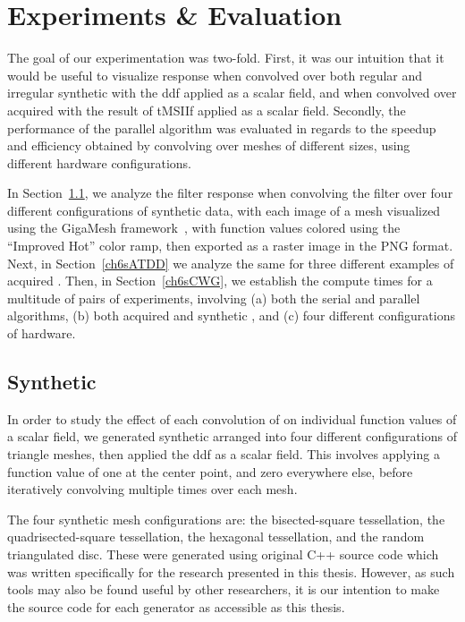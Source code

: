 \chapter{Experiments \& Evaluation}
\label{ch6}
The goal of our experimentation was two-fold. First, it was our intuition that it would be useful to visualize  response when convolved over both regular and irregular synthetic \tdd{} with the \gls{ddf} applied as a scalar field, and when convolved over acquired \tdd{} with the result of \gls{tMSIIf} applied as a scalar field. Secondly, the performance of the parallel algorithm was evaluated in regards to the speedup and efficiency obtained by convolving  over meshes of different sizes, using different hardware configurations.

In Section~\ref{ch6sSTDD}, we analyze the filter response when convolving the filter over four different configurations of synthetic data, with each image of a mesh visualized using the GigaMesh framework~\cite{Mara10}, with function values colored using the ``Improved Hot'' color ramp, then exported as a raster image in the \gls{PNG} format. Next, in Section~\ref{ch6sATDD} we analyze the same for three different examples of acquired \tdd{}. Then, in Section~\ref{ch6sCWG}, we establish the compute times for a multitude of pairs of experiments, involving (a) both the serial and parallel algorithms, (b) both acquired and synthetic \tdd{}, and (c) four different configurations of hardware.

%
%
%
%
%
%
\section{Synthetic \tdd{}}
\label{ch6sSTDD}
In order to study the effect of each convolution of  on individual function values of a scalar field, we generated synthetic \tdd{} arranged into four different configurations of triangle meshes, then applied the \gls{ddf} as a scalar field. This involves applying a function value of one at the center point, and zero everywhere else, before iteratively convolving  multiple times over each mesh.

The four synthetic mesh configurations are: the bisected-square tessellation, the quadrisected-square tessellation, the hexagonal tessellation, and the random triangulated disc. These were generated using original C++ source code which was written specifically for the research presented in this thesis. However, as such tools may also be found useful by other researchers, it is our intention to make the source code for each generator as accessible as this thesis.

